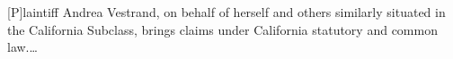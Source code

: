 [P]laintiff Andrea Vestrand, on behalf 
of herself and others similarly situated in the California Subclass, 
brings claims under California statutory and common law.\ldots
%
%

